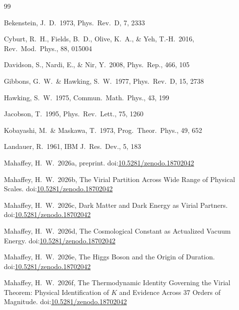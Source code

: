 \documentclass[12pt,a4paper]{article}
\begin{document}

\begin{thebibliography}{99}

Bekenstein, J.\ D.\ 1973, Phys.\ Rev.\ D, 7, 2333

Cyburt, R.\ H., Fields, B.\ D., Olive, K.\ A., \& Yeh, T.-H.\ 2016,
Rev.\ Mod.\ Phys., 88, 015004

Davidson, S., Nardi, E., \& Nir, Y.\ 2008, Phys.\ Rep., 466, 105

Gibbons, G.\ W.\ \& Hawking, S.\ W.\ 1977, Phys.\ Rev.\ D, 15, 2738

Hawking, S.\ W.\ 1975, Commun.\ Math.\ Phys., 43, 199

Jacobson, T.\ 1995, Phys.\ Rev.\ Lett., 75, 1260

Kobayashi, M.\ \& Maskawa, T.\ 1973, Prog.\ Theor.\ Phys., 49, 652

Landauer, R.\ 1961, IBM J.\ Res.\ Dev., 5, 183


Mahaffey, H.\ W.\ 2026a, preprint.
doi:\href{https://doi.org/10.5281/zenodo.18702042}{10.5281/zenodo.18702042}

Mahaffey, H.\ W.\ 2026b, The Virial Partition Across Wide Range of
Physical Scales.
doi:\href{https://doi.org/10.5281/zenodo.18702042}{10.5281/zenodo.18702042}

Mahaffey, H.\ W.\ 2026c, Dark Matter and Dark Energy as Virial Partners.
doi:\href{https://doi.org/10.5281/zenodo.18702042}{10.5281/zenodo.18702042}

Mahaffey, H.\ W.\ 2026d, The Cosmological Constant as Actualized Vacuum
Energy.
doi:\href{https://doi.org/10.5281/zenodo.18702042}{10.5281/zenodo.18702042}

Mahaffey, H.\ W.\ 2026e, The Higgs Boson and the Origin of Duration.
doi:\href{https://doi.org/10.5281/zenodo.18702042}{10.5281/zenodo.18702042}

Mahaffey, H.\ W.\ 2026f, The Thermodynamic Identity Governing the Virial
Theorem: Physical Identification of $K$ and Evidence Across 37 Orders of
Magnitude.
doi:\href{https://doi.org/10.5281/zenodo.18702042}{10.5281/zenodo.18702042}


\end{thebibliography}
\end{document}
